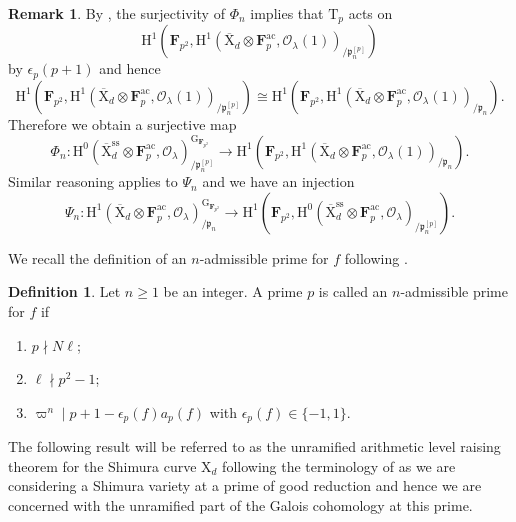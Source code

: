 \documentclass[10pt]{amsart}
\numberwithin{equation}{section}
\theoremstyle{plain}
\numberwithin{equation}{section}
\theoremstyle{definition}
\newtheorem{definition}[theorem]{Definition}
\newtheorem{remark}[equation]{Remark}
\theoremstyle{remark}
\def\ac{\mathrm{ac}}
\def\ss{\mathrm{ss}}
\def\ac{\mathrm{ac}}
\def\calO{\mathcal{O}}
\def\frakp{\mathfrak{p}}
\def\FF{\mathbf{F}}
\def\rmG{\mathrm{G}}
\def\rmH{\mathrm{H}}
\def\rmX{\mathrm{X}}
\def\rmXbar{\overline{\rmX}}
\def\rmT{\mathrm{T}}
\begin{document}
\begin{remark}\label{jump-the-grading}
By \cite[Lemma 9.1]{BD}, the surjectivity of ${\Phi}_{n}$ implies that $\rmT_{p}$ acts on 
\begin{equation*}
\rmH^{1}(\FF_{p^{2}}, \rmH^{1}(\rmXbar_{d}\otimes{\FF^{\ac}_{p}}, \calO_{\lambda}(1))_{/\frakp^{[p]}_{n}}) 
\end{equation*}
by $\epsilon_{p}(p+1)$ and hence 
\begin{equation*}
\rmH^{1}(\FF_{p^{2}}, \rmH^{1}(\rmXbar_{d}\otimes{\FF^{\ac}_{p}}, \calO_{\lambda}(1))_{/\frakp^{[p]}_{n}})\cong \rmH^{1}(\FF_{p^{2}}, \rmH^{1}(\rmXbar_{d}\otimes{\FF^{\ac}_{p}}, \calO_{\lambda}(1))_{/\frakp_{n}}).
\end{equation*}
Therefore we obtain a surjective map 
\begin{equation*}
\Phi_{n}: \rmH^{0}(\overline{\rmX}^{\ss}_{d}\otimes{\FF^{\ac}_{p}}, \calO_{\lambda})_{/\frakp^{[p]}_{n}}^{\rmG_{\FF_{p^{2}}}}\rightarrow  \rmH^{1}(\FF_{p^{2}}, \rmH^{1}(\overline{\rmX}_{d} \otimes{\FF^{\ac}_{p}}, \calO_{\lambda}(1))_{/\frakp_{n}}). 
\end{equation*}
Similar reasoning applies to $\Psi_{n}$ and we have an injection 
\begin{equation*}
\Psi_{n}: \rmH^{1}(\overline{\rmX}_{d}\otimes \FF^{\ac}_{p}, \calO_{\lambda})^{\rmG_{\FF_{p^{2}}}}_{/\frakp_{n}}\rightarrow   \rmH^{1}(\FF_{p^{2}}, \rmH^{0}(\overline{\rmX}^{\ss}_{d}\otimes\FF^{\ac}_{p}, \calO_{\lambda})_{/\frakp^{[p]}_{n}}).
\end{equation*}
\end{remark}

We recall the definition of an $n$-admissible prime for $f$ following \cite{BD}.
\begin{definition}
Let $n\geq 1$ be an integer. A prime $p$ is called an $n$-admissible prime for $f$ if 
\begin{enumerate}
\item $p\nmid N\ell$;
\item $\ell\nmid p^{2}-1$;
\item $\varpi^{n}\mid p+1-\epsilon_{p}(f)a_{p}(f)$ with $\epsilon_{p}(f)\in\{-1, 1\}$. 
\end{enumerate}
\end{definition} 

The following result will be referred to as the unramified arithmetic level raising theorem for the Shimura curve $\rmX_{d}$ following the terminology of \cite{Xiao} as we are considering a Shimura variety at a prime of good reduction and hence we are concerned with the unramified part of the Galois cohomology at this prime.
\end{document}

